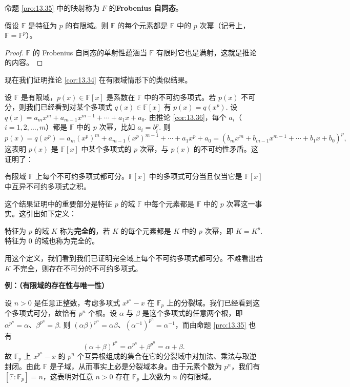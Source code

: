 \begin{definition}
命题 \ref{pro:13.35} 中的映射称为 \(F\) 的\textbf{Frobenius 自同态}。
\end{definition}

\begin{corollary}\label{cor:13.36}
假设 \(\mathbb{F}\) 是特征为 \(p\) 的有限域。则 \(\mathbb{F}\) 的每个元素都是 \(\mathbb{F}\) 中的 \(p\) 次幂（记号上，\(\mathbb{F} = \mathbb{F}^p\)）。
\end{corollary}

\begin{proof}
\(\mathbb{F}\) 的 Frobenius 自同态的单射性蕴涵当 \(\mathbb{F}\) 有限时它也是满射，这就是推论的内容。
\end{proof}

现在我们证明推论 \ref{cor:13.34} 在有限域情形下的类似结果。

设 \(\mathbb{F}\) 是有限域，\(p(x) \in \mathbb{F}[x]\) 是系数在 \(\mathbb{F}\) 中的不可约多项式。若 \(p(x)\) 不可分，则我们已经看到对某个多项式 \(q(x) \in \mathbb{F}[x]\) 有 \(p(x) = q(x^p)\). 设 \(q(x) = a_mx^m+a_{m-1}x^{m-1}+\cdots+a_1x+a_0\). 由推论 \ref{cor:13.36}，每个 \(a_i\)（\(i = 1, 2, \ldots, m\)）都是 \(\mathbb{F}\) 中的 \(p\) 次幂，比如 \(a_i = b_i^p\). 则
\[
p(x) = q(x^p) = a_m(x^p)^m+a_{m-1}(x^p)^{m-1}+\cdots+a_1x^p+a_0 = (b_mx^m+b_{m-1}x^{m-1}+\cdots+b_1x+b_0)^p,
\]
这表明 \(p(x)\) 是 \(\mathbb{F}[x]\) 中某个多项式的 \(p\) 次幂，与 \(p(x)\) 的不可约性矛盾。这证明了：

\begin{proposition}\label{pro:13.37}
有限域 \(\mathbb{F}\) 上每个不可约多项式都可分。\(\mathbb{F}[x]\) 中的多项式可分当且仅当它是 \(\mathbb{F}[x]\) 中互异不可约多项式之积。
\end{proposition}

这个结果证明中的重要部分是特征 \(p\) 的域 \(\mathbb{F}\) 中每个元素都是 \(\mathbb{F}\) 中的 \(p\) 次幂这一事实。这引出如下定义：

\begin{definition}
特征为 \(p\) 的域 \(K\) 称为\textbf{完全的}，若 \(K\) 的每个元素都是 \(K\) 中的 \(p\) 次幂，即 \(K = K^p\). 特征为 0 的域也称为完全的。
\end{definition}

用这个定义，我们看到我们已证明完全域上每个不可约多项式都可分。不难看出若 \(K\) 不完全，则存在不可分的不可约多项式。

\noindent\textbf{例：（有限域的存在性与唯一性）}

设 \(n > 0\) 是任意正整数，考虑多项式 \(x^{p^n}-x\) 在 \(\mathbb{F}_p\) 上的分裂域。我们已经看到这个多项式可分，故恰有 \(p^n\) 个根。设 \(\alpha\) 与 \(\beta\) 是这个多项式的任意两个根，即 \(\alpha^{p^n} = \alpha\)、\(\beta^{p^n} = \beta\). 则 \((\alpha\beta)^{p^n} = \alpha\beta\)、\((\alpha^{-1})^{p^n} = \alpha^{-1}\)，而由命题 \ref{pro:13.35} 也有
\[
(\alpha+\beta)^{p^n} = \alpha^{p^n}+\beta^{p^n} = \alpha+\beta.
\]
故 \(\mathbb{F}_p\) 上 \(x^{p^n}-x\) 的 \(p^n\) 个互异根组成的集合在它的分裂域中对加法、乘法与取逆封闭。由此 \(\mathbb{F}\) 是子域，从而事实上必是分裂域本身。由于元素个数为 \(p^n\)，我们有 \([\mathbb{F}:\mathbb{F}_p] = n\)，这表明对任意 \(n > 0\) 存在 \(\mathbb{F}_p\) 上次数为 \(n\) 的有限域。

